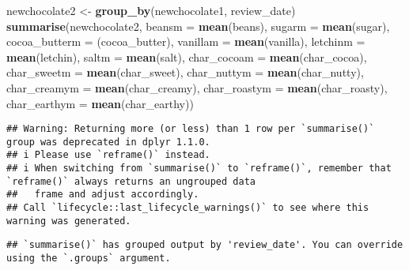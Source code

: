 \documentclass[
]{article}
\newenvironment{Shaded}{\begin{snugshade}}{\end{snugshade}}
\newcommand{\AttributeTok}[1]{\textcolor[rgb]{0.13,0.29,0.53}{#1}}
\newcommand{\FunctionTok}[1]{\textcolor[rgb]{0.13,0.29,0.53}{\textbf{#1}}}
\newcommand{\NormalTok}[1]{#1}
\newcommand{\OtherTok}[1]{\textcolor[rgb]{0.56,0.35,0.01}{#1}}
\begin{document}
\begin{Shaded}
\begin{Highlighting}[]
\NormalTok{newchocolate2 }\OtherTok{\textless{}{-}} \FunctionTok{group\_by}\NormalTok{(newchocolate1, review\_date)}
\FunctionTok{summarise}\NormalTok{(newchocolate2, }\AttributeTok{beansm =} \FunctionTok{mean}\NormalTok{(beans), }\AttributeTok{sugarm =} \FunctionTok{mean}\NormalTok{(sugar), }\AttributeTok{cocoa\_butterm =}\NormalTok{ (cocoa\_butter), }\AttributeTok{vanillam =} \FunctionTok{mean}\NormalTok{(vanilla), }\AttributeTok{letchinm =} \FunctionTok{mean}\NormalTok{(letchin), }\AttributeTok{saltm =} \FunctionTok{mean}\NormalTok{(salt), }\AttributeTok{char\_cocoam =} \FunctionTok{mean}\NormalTok{(char\_cocoa), }\AttributeTok{char\_sweetm =} \FunctionTok{mean}\NormalTok{(char\_sweet), }\AttributeTok{char\_nuttym =} \FunctionTok{mean}\NormalTok{(char\_nutty), }\AttributeTok{char\_creamym =} \FunctionTok{mean}\NormalTok{(char\_creamy), }\AttributeTok{char\_roastym =} \FunctionTok{mean}\NormalTok{(char\_roasty), }\AttributeTok{char\_earthym =} \FunctionTok{mean}\NormalTok{(char\_earthy))}
\end{Highlighting}
\end{Shaded}

\begin{verbatim}
## Warning: Returning more (or less) than 1 row per `summarise()` group was deprecated in dplyr 1.1.0.
## i Please use `reframe()` instead.
## i When switching from `summarise()` to `reframe()`, remember that `reframe()` always returns an ungrouped data
##   frame and adjust accordingly.
## Call `lifecycle::last_lifecycle_warnings()` to see where this warning was generated.
\end{verbatim}

\begin{verbatim}
## `summarise()` has grouped output by 'review_date'. You can override using the `.groups` argument.
\end{verbatim}
\end{document}
